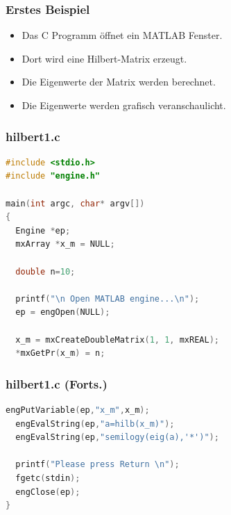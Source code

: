 \documentclass[hyperref={xetex}]{beamer}
\begin{document}
% 
% 
%
%
\begin{frame}[fragile]\frametitle{Erstes Beispiel}
\begin{itemize}
\item Das C Programm \"offnet ein MATLAB Fenster.
\item Dort wird eine Hilbert-Matrix erzeugt.
\item Die Eigenwerte der Matrix werden berechnet.
\item Die Eigenwerte werden grafisch veranschaulicht.
\end{itemize}
\end{frame}
%
%
\begin{frame}[fragile]\frametitle{hilbert1.c}
\begin{lstlisting}[language=C++]
#include <stdio.h>
#include "engine.h"
 
main(int argc, char* argv[])
{
  Engine *ep;
  mxArray *x_m = NULL;
   
  double n=10;
      
  printf("\n Open MATLAB engine...\n");
  ep = engOpen(NULL);
     
  x_m = mxCreateDoubleMatrix(1, 1, mxREAL);
  *mxGetPr(x_m) = n;
\end{lstlisting}
\end{frame}
%
%
%
\begin{frame}[fragile]\frametitle{hilbert1.c (Forts.)}
\begin{lstlisting}[language=C++]   
  engPutVariable(ep,"x_m",x_m);
  engEvalString(ep,"a=hilb(x_m)");
  engEvalString(ep,"semilogy(eig(a),'*')");
     
  printf("Please press Return \n");
  fgetc(stdin);
  engClose(ep);
}
\end{lstlisting}
\end{frame}
%
%
\end{document}
